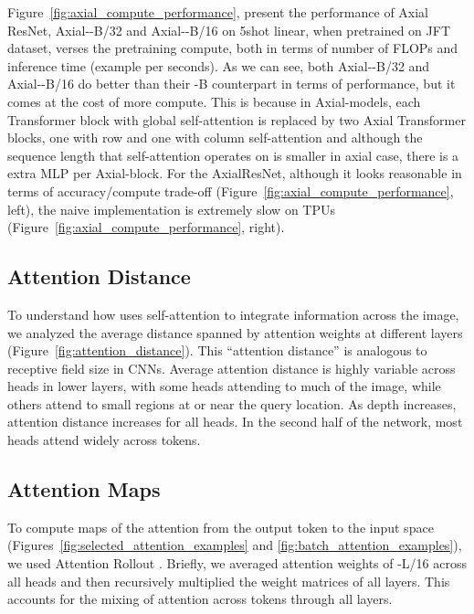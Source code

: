 Figure~\ref{fig:axial_compute_performance}, present the performance of Axial ResNet, Axial-\oursabbrv-B/32 and Axial-\oursabbrv-B/16 on \imagenet 5shot linear, when pretrained on JFT dataset, verses the pretraining compute, both in terms of number of FLOPs and inference time (example per seconds). As we can see, both 
Axial-\oursabbrv-B/32 and Axial-\oursabbrv-B/16 do better than their \oursabbrv-B counterpart in terms of performance, but it comes at the cost of more compute. This is because in Axial-\oursabbrv models, each Transformer block with global self-attention is replaced by two Axial Transformer blocks, one with row and one with column self-attention and although the sequence length that self-attention operates on is smaller in axial case, there is a extra MLP per Axial-\oursabbrv block.  
For the AxialResNet, although it looks reasonable in terms of accuracy/compute trade-off (Figure~\ref{fig:axial_compute_performance}, left), the naive implementation is extremely slow on TPUs (Figure~\ref{fig:axial_compute_performance}, right).


 
\subsection{Attention Distance}
\label{sec:appendix_attention_distance}

To understand how \oursabbrv uses self-attention to integrate information across the image, we analyzed the average distance spanned by attention weights at different layers (Figure~\ref{fig:attention_distance}). This ``attention distance'' is analogous to receptive field size in CNNs. Average attention distance is highly variable across heads in lower layers, with some heads attending to much of the image, while others attend to small regions at or near the query location. As depth increases, attention distance increases for all heads. In the second half of the network, most heads attend widely across tokens.

\subsection{Attention Maps}
To compute maps of the attention from the output token to the input space (Figures~\ref{fig:selected_attention_examples} and \ref{fig:batch_attention_examples}), we used Attention Rollout \citep{abnar2020quantifying}. Briefly, we averaged attention weights of \oursabbrv-L/16 across all heads and then recursively multiplied the weight matrices of all layers. This accounts for the mixing of attention across tokens through all layers.

